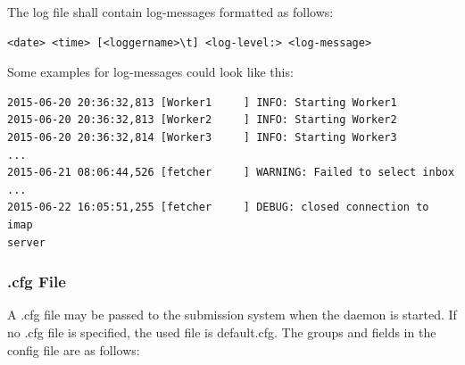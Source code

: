 The log file shall contain log-messages formatted as follows:

\begin{verbatim}
<date> <time> [<loggername>\t] <log-level:> <log-message>
\end{verbatim}

Some examples for log-messages could look like this:

\begin{verbatim}
2015-06-20 20:36:32,813 [Worker1     ] INFO: Starting Worker1
2015-06-20 20:36:32,813 [Worker2     ] INFO: Starting Worker2
2015-06-20 20:36:32,814 [Worker3     ] INFO: Starting Worker3
...
2015-06-21 08:06:44,526 [fetcher     ] WARNING: Failed to select inbox
...
2015-06-22 16:05:51,255 [fetcher     ] DEBUG: closed connection to imap
server
\end{verbatim}

\subsubsection{.cfg File}

A .cfg file may be passed to the submission system when the daemon is started. If no .cfg file
is specified, the used file is default.cfg. The groups and fields in the config file are as follows:

